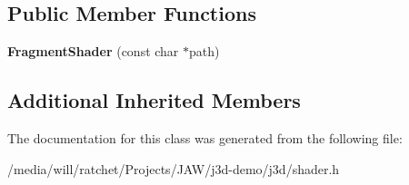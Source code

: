 \subsection*{Public Member Functions}
\begin{DoxyCompactItemize}
\item 
\hypertarget{classj3d_1_1ShaderProgram_1_1FragmentShader_a7f94ca0e3a5d5f5662be4f9bb3bf01a9}{}{\bfseries Fragment\+Shader} (const char $\ast$path)\label{classj3d_1_1ShaderProgram_1_1FragmentShader_a7f94ca0e3a5d5f5662be4f9bb3bf01a9}

\end{DoxyCompactItemize}
\subsection*{Additional Inherited Members}


The documentation for this class was generated from the following file\+:\begin{DoxyCompactItemize}
\item 
/media/will/ratchet/\+Projects/\+J\+A\+W/j3d-\/demo/j3d/shader.\+h\end{DoxyCompactItemize}
